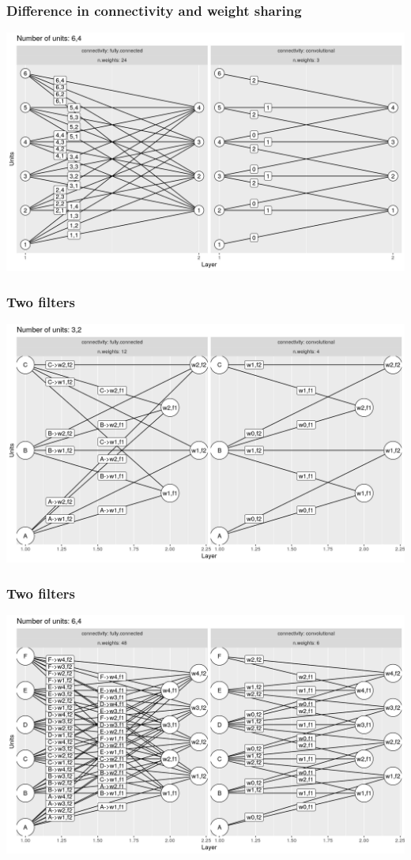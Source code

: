 \documentclass{beamer}
\begin{document}
\begin{frame}
  \frametitle{Difference in connectivity and weight sharing}
  \includegraphics[width=\textwidth]{figure-convolutional-6-3}
  
\end{frame}

\begin{frame}
  \frametitle{Two filters}
  \includegraphics[width=\textwidth]{figure-convolutional-filters-3-2}
  
\end{frame}

\begin{frame}
  \frametitle{Two filters}
  \includegraphics[width=\textwidth]{figure-convolutional-filters-6-3}
  
\end{frame}
\end{document}
